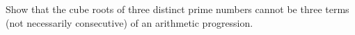 Show that the cube roots of three distinct prime numbers cannot be three terms (not necessarily consecutive) of an arithmetic progression.